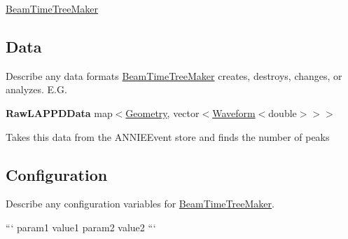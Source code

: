 \hyperlink{classBeamTimeTreeMaker}{Beam\-Time\-Tree\-Maker}

\subsection*{Data}

Describe any data formats \hyperlink{classBeamTimeTreeMaker}{Beam\-Time\-Tree\-Maker} creates, destroys, changes, or analyzes. E.\-G.

{\bfseries Raw\-L\-A\-P\-P\-D\-Data} {\ttfamily map$<$\hyperlink{classGeometry}{Geometry}, vector$<$\hyperlink{classWaveform}{Waveform}$<$double$>$$>$$>$}
\begin{DoxyItemize}
\item Takes this data from the {\ttfamily A\-N\-N\-I\-E\-Event} store and finds the number of peaks
\end{DoxyItemize}

\subsection*{Configuration}

Describe any configuration variables for \hyperlink{classBeamTimeTreeMaker}{Beam\-Time\-Tree\-Maker}.

``` param1 value1 param2 value2 ``` 